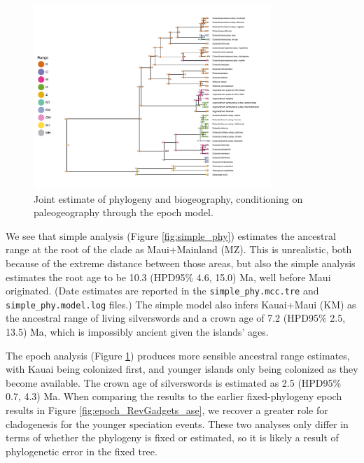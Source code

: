\begin{figure}[!h]
\centering
\includegraphics[width=0.8\textwidth]{figures/fig_epoch_phy_RevGadgets_ase.pdf} 
\caption{Joint estimate of phylogeny and biogeography, conditioning on paleogeography through the epoch model.}
\label{fig:epoch_phy}
\end{figure}

We see that simple analysis (Figure \ref{fig:simple_phy}) estimates the ancestral range at the root of the clade as Maui+Mainland (MZ).
This is unrealistic, both because of the extreme distance between those areas, but also the simple analysis estimates the root age to be 10.3 (HPD95\% 4.6, 15.0) Ma, well before Maui originated.
(Date estimates are reported in the {\tt simple\_phy.mcc.tre} and {\tt simple\_phy.model.log} files.)
The simple model also infers Kauai+Maui (KM) as the ancestral range of living silverswords and a crown age of 7.2 (HPD95\% 2.5, 13.5) Ma, which is impossibly ancient given the islands' ages.

The epoch analysis (Figure \ref{fig:epoch_phy}) produces more sensible ancestral range estimates, with Kauai being colonized first, and younger islands only being colonized as they become available.
The crown age of silverswords is estimated as 2.5 (HPD95\% 0.7, 4.3) Ma.
When comparing the results to the earlier fixed-phylogeny epoch results in Figure \ref{fig:epoch_RevGadgets_ase}, we recover a greater role for cladogenesis for the younger speciation events.
These two analyses only differ in terms of whether the phylogeny is fixed or estimated, so it is likely a result of phylogenetic error in the fixed tree.



